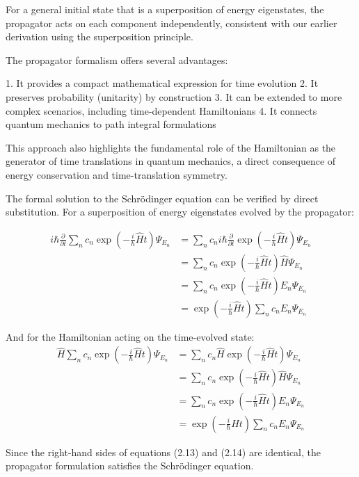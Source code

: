 \documentclass[italian]{HKNdocument}
\begin{document}
For a general initial state that is a superposition of energy eigenstates, the propagator acts on each component independently, consistent with our earlier derivation using the superposition principle.

The propagator formalism offers several advantages:

1. It provides a compact mathematical expression for time evolution
2. It preserves probability (unitarity) by construction
3. It can be extended to more complex scenarios, including time-dependent Hamiltonians
4. It connects quantum mechanics to path integral formulations

This approach also highlights the fundamental role of the Hamiltonian as the generator of time translations in quantum mechanics, a direct consequence of energy conservation and time-translation symmetry.


The formal solution to the Schrödinger equation can be verified by direct substitution. For a superposition of energy eigenstates evolved by the propagator:

\begin{align*}
i\hbar\frac{\partial}{\partial t}\sum_n c_n\exp\left(-\frac{i}{\hbar}\hat{H}t\right)\Psi_{E_n} &= \sum_n c_n i\hbar\frac{\partial}{\partial t}\exp\left(-\frac{i}{\hbar}\hat{H}t\right)\Psi_{E_n} \\
&= \sum_n c_n\exp\left(-\frac{i}{\hbar}\hat{H}t\right)\hat{H}\Psi_{E_n} \\
&= \sum_n c_n\exp\left(-\frac{i}{\hbar}\hat{H}t\right)E_n\Psi_{E_n} \tag{2.13} \\
&= \exp\left(-\frac{i}{\hbar}\hat{H}t\right)\sum_n c_nE_n\Psi_{E_n}
\end{align*}

And for the Hamiltonian acting on the time-evolved state:
\begin{align*}
\hat{H}\sum_n c_n\exp\left(-\frac{i}{\hbar}\hat{H}t\right)\Psi_{E_n} &= \sum_n c_n\hat{H}\exp\left(-\frac{i}{\hbar}\hat{H}t\right)\Psi_{E_n} \\
&= \sum_n c_n\exp\left(-\frac{i}{\hbar}\hat{H}t\right)\hat{H}\Psi_{E_n} \\
&= \sum_n c_n\exp\left(-\frac{i}{\hbar}\hat{H}t\right)E_n\Psi_{E_n} \tag{2.14} \\
&= \exp\left(-\frac{i}{\hbar}\hat{H}t\right)\sum_n c_nE_n\Psi_{E_n}
\end{align*}

Since the right-hand sides of equations (2.13) and (2.14) are identical, the propagator formulation satisfies the Schrödinger equation.
\end{document}
